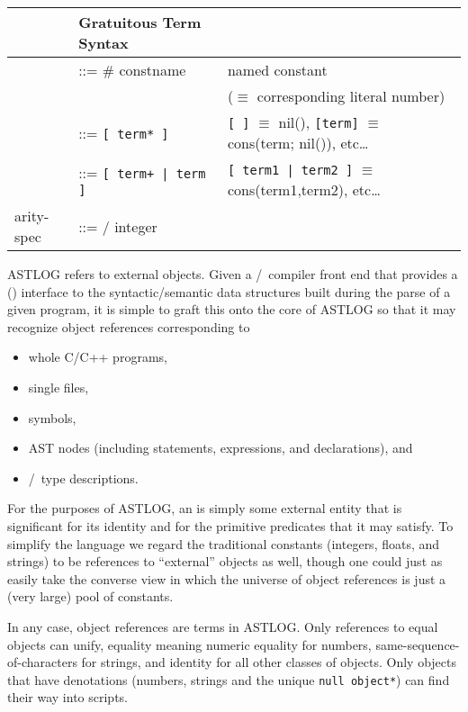 \noindent
\begin{tabular}{l l l}
\hline
&Gratuitous Term Syntax&\\
\hline
&::= \# constname & named constant\\&&($\equiv$ corresponding literal number)\\
&::= \verb|[ term* ]| & \verb|[ ]| $\equiv$ nil(), \verb|[term]| $\equiv$
cons(term; nil()), etc\ldots\\
&::= \verb$[ term+ | term ]$ & \verb$[ term1 | term2 ]$ $\equiv$
cons(term1,term2), etc\ldots\\
arity-spec & ::= / integer &\\ 
\end{tabular}


ASTLOG refers to external objects. Given a \ci/\cpp\ compiler front end that
provides a (\cpp) interface to the syntactic/semantic data structures built
during the parse of a given program, it is simple to graft this onto the core of
ASTLOG so that it may recognize object references corresponding to
\begin{itemize}[nosep]
  \item whole C/C++ programs,
  \item single files,
  \item symbols,
  \item AST nodes (including statements, expressions, and declarations), and
  \item \ci/\cpp\ type descriptions.
\end{itemize}

For the purposes of ASTLOG, an  is simply some external entity that
is significant for its identity and for the primitive predicates that it may
satisfy. To simplify the language we regard the traditional
constants (integers, floats, and strings) to be references to ``external''
objects as well, though one could just as easily take the converse view in which
the universe of object references is just a (very large) pool of
constants.

In any case, object references are terms in ASTLOG. Only references to equal
objects can unify, equality meaning numeric equality for numbers,
same-sequence-of-characters for strings, and identity for all other classes of
objects. Only objects that have denotations (numbers, strings and the unique
\verb|null object*|) can find their way into scripts.




\secup

\secup